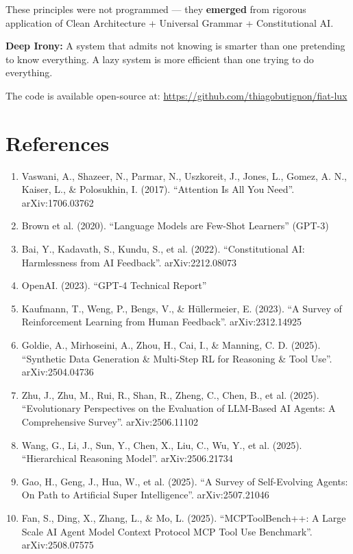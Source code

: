\documentclass[11pt]{article}
\begin{document}
These principles were not programmed --- they \textbf{emerged} from rigorous application of Clean Architecture + Universal Grammar + Constitutional AI.

\textbf{Deep Irony:} A system that admits not knowing is smarter than one pretending to know everything. A lazy system is more efficient than one trying to do everything.

The code is available open-source at:
\url{https://github.com/thiagobutignon/fiat-lux}

\section*{References}

\begin{enumerate}
    \item Vaswani, A., Shazeer, N., Parmar, N., Uszkoreit, J., Jones, L., Gomez, A. N., Kaiser, L., \& Polosukhin, I. (2017). ``Attention Is All You Need''. arXiv:1706.03762
    \item Brown et al. (2020). ``Language Models are Few-Shot Learners'' (GPT-3)
    \item Bai, Y., Kadavath, S., Kundu, S., et al. (2022). ``Constitutional AI: Harmlessness from AI Feedback''. arXiv:2212.08073
    \item OpenAI. (2023). ``GPT-4 Technical Report''
    \item Kaufmann, T., Weng, P., Bengs, V., \& Hüllermeier, E. (2023). ``A Survey of Reinforcement Learning from Human Feedback''. arXiv:2312.14925
    \item Goldie, A., Mirhoseini, A., Zhou, H., Cai, I., \& Manning, C. D. (2025). ``Synthetic Data Generation \& Multi-Step RL for Reasoning \& Tool Use''. arXiv:2504.04736
    \item Zhu, J., Zhu, M., Rui, R., Shan, R., Zheng, C., Chen, B., et al. (2025). ``Evolutionary Perspectives on the Evaluation of LLM-Based AI Agents: A Comprehensive Survey''. arXiv:2506.11102
    \item Wang, G., Li, J., Sun, Y., Chen, X., Liu, C., Wu, Y., et al. (2025). ``Hierarchical Reasoning Model''. arXiv:2506.21734
    \item Gao, H., Geng, J., Hua, W., et al. (2025). ``A Survey of Self-Evolving Agents: On Path to Artificial Super Intelligence''. arXiv:2507.21046
    \item Fan, S., Ding, X., Zhang, L., \& Mo, L. (2025). ``MCPToolBench++: A Large Scale AI Agent Model Context Protocol MCP Tool Use Benchmark''. arXiv:2508.07575

\end{enumerate}
\end{document}
